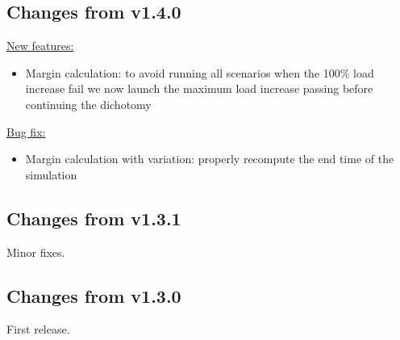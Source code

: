 \documentclass[a4paper, 12pt]{report}
\begin{document}
\subsection{Changes from v1.4.0}

\underline{New features:}
\begin{itemize}
\item Margin calculation: to avoid running all scenarios when the 100\% load increase fail we now launch the maximum load increase passing before continuing the dichotomy
\end{itemize}

\underline{Bug fix:}
\begin{itemize}
\item Margin calculation with variation: properly recompute the end time of the simulation
\end{itemize}

\subsection{Changes from v1.3.1}
Minor fixes.

\subsection{Changes from v1.3.0}
First release.
\end{document}
